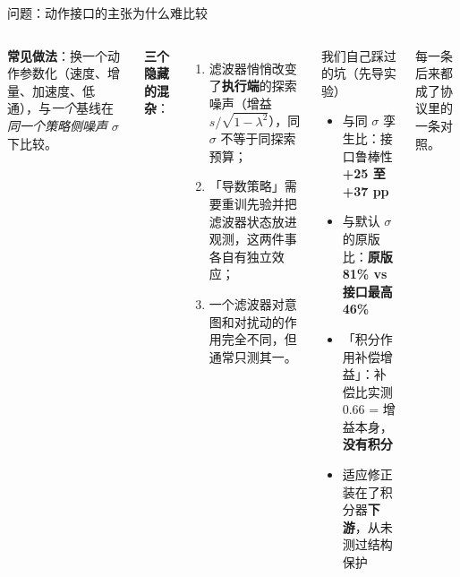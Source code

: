 \documentclass[10pt,aspectratio=169]{beamer}
\newcommand{\hl}[1]{\textcolor{good}{\textbf{#1}}}
\newcommand{\ba}[1]{\textcolor{bad}{\textbf{#1}}}
\begin{document}
\begin{frame}{问题：动作接口的主张为什么难比较}
\begin{columns}[T]
\textbf{常见做法}：换一个动作参数化（速度、增量、加速度、低通），与\emph{一个}基线在\emph{同一个策略侧噪声} $\sigma$ 下比较。

\vspace{2mm}
\textbf{三个隐藏的混杂}：
\begin{enumerate}
\item 滤波器悄悄改变了\textbf{执行端}的探索噪声（增益 $s/\sqrt{1-\lambda^2}$），同 $\sigma$ 不等于同探索预算；
\item 「导数策略」需要重训先验并把滤波器状态放进观测，这两件事各自有独立效应；
\item 一个滤波器对意图和对扰动的作用完全不同，但通常只测其一。
\end{enumerate}
\begin{block}{我们自己踩过的坑（先导实验）}
\begin{itemize}
\item 与同 $\sigma$ 孪生比：接口鲁棒性 \hl{+25 至 +37 pp}
\item 与默认 $\sigma$ 的原版比：\ba{原版 81\% vs 接口最高 46\%}
\item 「积分作用补偿增益」：补偿比实测 0.66 = 增益本身，\ba{没有积分}
\item 适应修正装在了积分器\ba{下游}，从未测过结构保护
\end{itemize}
\end{block}
每一条后来都成了协议里的一条对照。
\end{columns}
\end{frame}
\end{document}
